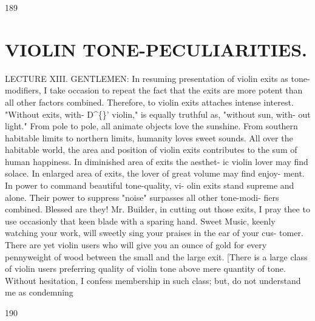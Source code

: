 \documentclass{article}
\begin{document}
189

\section*{VIOLIN TONE-PECULIARITIES.}
LECTURE XIII. GENTLEMEN: In resuming presentation of violin exits as tone-modifiers, I take occasion to repeat the fact that the exits are more potent than all other factors combined. Therefore, to violin exits attaches intense interest. "Without exits, with- D\textasciicircum\{\}' violin," is equally truthful as, "without sun, with- out light." From pole to pole, all animate objects love the sunshine. From southern habitable limits to northern limits, humanity loves sweet sounds. All over the habitable world, the area and position of violin exits contributes to the sum of human happiness. In diminished area of exits the aesthet- ic violin lover may find solace. In enlarged area of exits, the lover of great volume may find enjoy- ment. In power to command beautiful tone-quality, vi- olin exits stand supreme and alone. Their power to suppress "noise" surpasses all other tone-modi- fiers combined. Blessed are they! Mr. Builder, in cutting out those exits, I pray thee to use occasionly that keen blade with a sparing hand. Sweet Music, keenly watching your work, will sweetly sing your praises in the ear of your cus- tomer. There are yet violin users who will give you an ounce of gold for every pennyweight of wood between the small and the large exit. [There is a large class of violin users preferring quality of violin tone above mere quantity of tone. Without hesitation, I confess membership in such class; but, do not understand me as condemning

190
\end{document}
